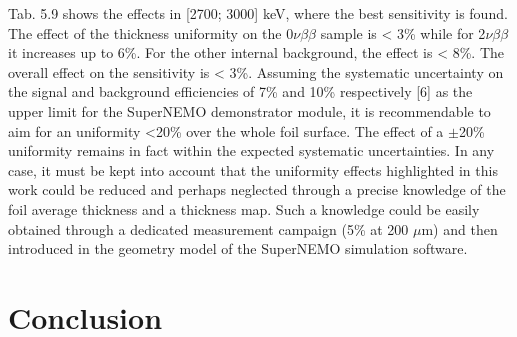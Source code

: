 \documentclass[main.tex]{subfiles}
\begin{document}
\bigskip


\NI Tab. 5.9 shows the effects in [2700; 3000] keV, where the best sensitivity is found. The effect of the thickness uniformity on the 0$\nu\beta\beta$ sample is < 3\% while for 2$\nu\beta\beta$ it increases up to 6\%. For the other internal background, the effect is < 8\%. The overall effect on the sensitivity is < 3\%. Assuming the systematic uncertainty on the signal and background efficiencies of 7\% and 10\% respectively [6] as the upper limit for the SuperNEMO demonstrator module, it is recommendable to aim for an uniformity <20\% over the whole foil surface. The effect of a $\pm$20\% uniformity remains in fact within the expected systematic uncertainties. In any case, it must be kept into account that the uniformity effects highlighted in this work could be reduced and perhaps neglected through a precise knowledge of the foil average thickness and a thickness map. Such a knowledge could be easily obtained through a dedicated measurement campaign (5\% at 200 $\mu$m) and then introduced in the geometry model of the SuperNEMO simulation software.


\section{Conclusion}
\end{document}
